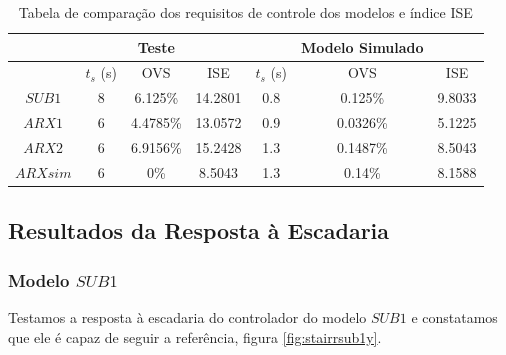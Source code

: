 \begin{table}[htb]
	\centering
	\begin{tabular}{|c|c|c|c|c|c|c|}
		\hline 
		&  & Teste &  &  & Modelo Simulado &  \\ 
		\hline 
		& $t_s$ (s) & OVS & ISE & $t_s$ (s) & OVS & ISE \\ 
		\hline 
		$SUB1$ & 8 & 6.125\% & 14.2801 & 0.8 & 0.125\% & 9.8033 \\ 
		\hline 
		$ARX1$ & 6 & 4.4785\% & 13.0572 & 0.9 & 0.0326\% & 5.1225 \\ 
		\hline 
		$ARX2$ & 6 & 6.9156\% & 15.2428 & 1.3 & 0.1487\% & 8.5043 \\ 
		\hline 
		$ARXsim$ & 6 & 0\% & 8.5043 & 1.3 & 0.14\% & 8.1588 \\ 
		\hline 
	\end{tabular}  
	\caption{Tabela de comparação dos requisitos de controle dos modelos e índice ISE}
	\label{tb:requisitosise}
\end{table}

\subsection{Resultados da Resposta à Escadaria}\label{rstair}

\subsubsection{Modelo $SUB1$}
Testamos a resposta à escadaria do controlador do modelo $SUB1$ e constatamos que ele é capaz de seguir a referência, figura \ref{fig:stairrsub1y}.

